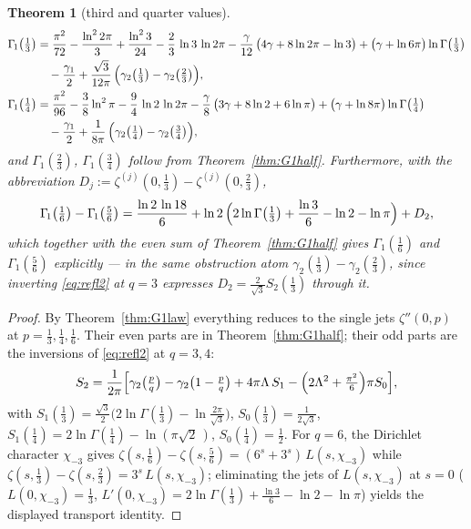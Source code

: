 \documentclass[11pt]{article}
\newtheorem{theorem}{Theorem}[section]
\theoremstyle{remark}
\begin{document}
\begin{theorem}[third and quarter values]\label{thm:G1thirds}
\begin{align*}
\Gamma_{\!1}\bigl(\tfrac13\bigr)
&=\frac{\pi^{2}}{72}-\frac{\ln ^{2}2\pi}{3}+\frac{\ln ^{2}3}{24}
-\frac{2}{3}\,\ln 3\,\ln 2 \pi
-\frac{\gamma}{12}\,\bigl(4 \gamma+8 \ln 2 \pi-\ln 3\bigr)
+\bigl(\gamma+\ln 6 \pi\bigr) \ln \Gamma\bigl(\tfrac{1}{3}\bigr)\\
&\quad-\frac{\gamma_{1}}{2}
+\frac{\sqrt{3}}{12 \pi}\,\Bigl(\gamma_{2}\bigl(\tfrac{1}{3}\bigr)-\gamma_{2}\bigl(\tfrac{2}{3}\bigr)\Bigr),\\
\Gamma_{\!1}\bigl(\tfrac14\bigr)
&=\frac{\pi^{2}}{96}-\frac{3}{8} \ln ^{2}\pi-\frac{9}{4}\,\ln 2\,\ln 2 \pi
-\frac{\gamma}{8}\,\bigl(3 \gamma+8 \ln 2+6 \ln \pi\bigr)
+\bigl(\gamma+\ln 8 \pi\bigr) \ln \Gamma\bigl(\tfrac{1}{4}\bigr)\\
&\quad-\frac{\gamma_{1}}{2}
+\frac{1}{8 \pi}\,\Bigl(\gamma_{2}\bigl(\tfrac{1}{4}\bigr)-\gamma_{2}\bigl(\tfrac{3}{4}\bigr)\Bigr),
\end{align*}
and $\Gamma_{\!1}(\tfrac23)$, $\Gamma_{\!1}(\tfrac34)$ follow from
Theorem~\ref{thm:G1half}. Furthermore, with the abbreviation
$D_j:=\zeta^{(j)}(0,\tfrac13)-\zeta^{(j)}(0,\tfrac23)$,
\[
\Gamma_{\!1}\bigl(\tfrac16\bigr)-\Gamma_{\!1}\bigl(\tfrac56\bigr)
=\frac{\ln2\,\ln18}{6}
+\ln2\,\Bigl(2\ln\Gamma\bigl(\tfrac13\bigr)+\frac{\ln3}{6}-\ln2-\ln\pi\Bigr)
+D_2 ,
\]
which together with the even sum of Theorem~\ref{thm:G1half} gives
$\Gamma_{\!1}(\tfrac16)$ and $\Gamma_{\!1}(\tfrac56)$ explicitly — in the
\emph{same} obstruction atom $\gamma_2(\tfrac13)-\gamma_2(\tfrac23)$, since
inverting \eqref{eq:refl2} at $q=3$ expresses
$D_2=\tfrac{2}{\sqrt3}S_2(\tfrac13)$ through it.
\end{theorem}

\begin{proof}
By Theorem~\ref{thm:G1law} everything reduces to the single jets
$\zeta''(0,p)$ at $p=\tfrac13,\tfrac14,\tfrac16$. Their even parts are in
Theorem~\ref{thm:G1half}; their odd parts are the inversions of
\eqref{eq:refl2} at $q=3,4$:
\[
S_2=\frac{1}{2\pi}\Bigl[\gamma_2\bigl(\tfrac pq\bigr)-\gamma_2\bigl(1-\tfrac pq\bigr)
+4\pi \Lambda\,S_1-\Bigl(2\Lambda^2+\tfrac{\pi^2}{6}\Bigr)\pi S_0\Bigr],
\]
with $S_1(\tfrac13)=\tfrac{\sqrt3}{2}\bigl(2\ln\Gamma(\tfrac13)-\ln\tfrac{2\pi}{\sqrt3}\bigr)$,
$S_0(\tfrac13)=\tfrac{1}{2\sqrt3}$,
$S_1(\tfrac14)=2\ln\Gamma(\tfrac14)-\ln(\pi\sqrt2\,)$,
$S_0(\tfrac14)=\tfrac12$.
For $q=6$, the Dirichlet character $\chi_{-3}$ gives
$\zeta(s,\tfrac16)-\zeta(s,\tfrac56)=(6^s+3^s)\,L(s,\chi_{-3})$ while
$\zeta(s,\tfrac13)-\zeta(s,\tfrac23)=3^s\,L(s,\chi_{-3})$; eliminating the
jets of $L(s,\chi_{-3})$ at $s=0$
($L(0,\chi_{-3})=\tfrac13$,
$L'(0,\chi_{-3})=2\ln\Gamma(\tfrac13)+\tfrac{\ln3}{6}-\ln2-\ln\pi$)
yields the displayed transport identity.
\end{proof}
\end{document}
